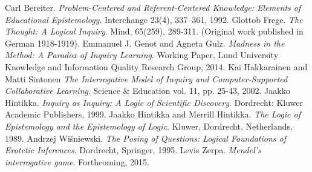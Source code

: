 \documentclass[a4paper,UKenglish]{lipics}
\begin{document}
\begin{thebibliography}{50}





 Carl Bereiter. \textsl{Problem-Centered and Referent-Centered Knowledge: Elements of 
Educational Epistemology}. Interchange 23(4), 337–361, 1992.
 Glottob Frege. \textsl{The Thought: A Logical Inquiry}. Mind, 65(259), 289-311. (Original work published in German 1918-1919).
 Emmanuel J. Genot and Agneta Gulz. \textsl{Madness in the Method: A Paradox of Inquiry Learning}. Working Paper, Lund University Knowledge and Information Quality Research Group, 2014.
 Kai Hakkarainen and Matti Sintonen  \textsl{The Interrogative Model of Inquiry and Computer-Supported Collaborative Learning}. Science \& Education vol. 11, pp. 25-43, 2002.
 Jaakko Hintikka. \textsl{Inquiry as Inquiry: A Logic of Scientific Discovery}. Dordrecht: Kluwer Academic Publishers, 1999.
 Jaakko Hintikka and Merrill Hintikka. \textsl{The Logic of Epistemology and the Epistemology of Logic}. Kluwer, Dordrecht, Netherlands, 1989.
 Andrzej Wiśniewski. \textsl{The Posing of Questions: Logical Foundations of Erotetic Inferences}. Dordrecht, Springer, 1995.
 Levis Zerpa. \textsl{Mendel’s interrogative game}. Forthcoming, 2015.

\end{thebibliography}
\end{document}
